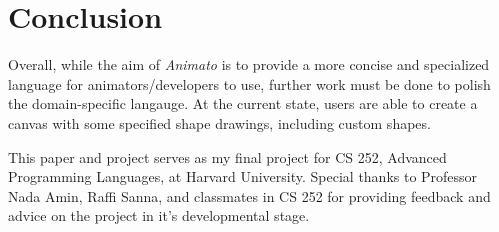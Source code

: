 \documentclass[acmsmall,screen]{acmart}
\begin{document}
\section{Conclusion}
Overall, while the aim of \textit{Animato} is to provide a more concise and specialized language for animators/developers to use, further work must be done to polish the domain-specific langauge.
At the current state, users are able to create a canvas with some specified shape drawings, including custom shapes. 

\begin{acks}
This paper and project serves as my final project for CS 252, Advanced Programming Languages, at Harvard University. Special thanks to Professor Nada Amin, Raffi Sanna, and classmates in CS 252 for providing feedback and advice on the project in it's developmental stage.
\end{acks}



\end{document}
